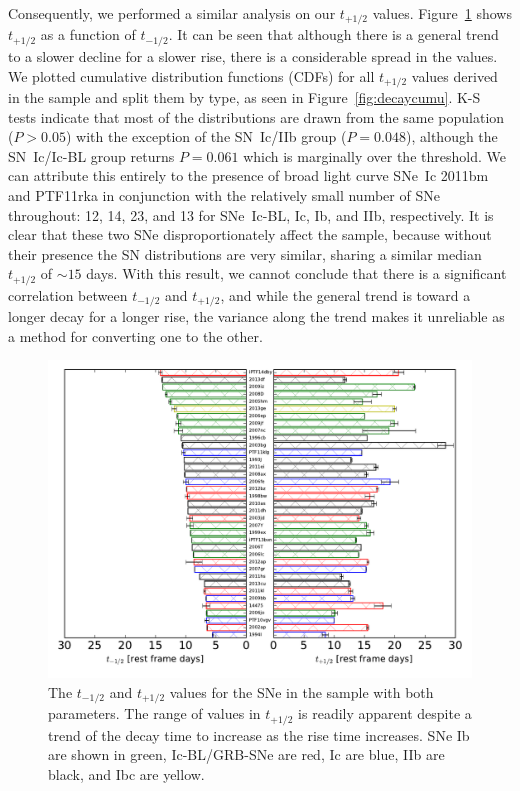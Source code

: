 \documentclass[a4paper,fleqn,usenatbib]{mnras}
\begin{document}
Consequently, we performed a similar analysis on our $t_{+1/2}$ values. Figure~\ref{fig:risedecay} shows $t_{+1/2}$ as a function of $t_{-1/2}$. It can be seen that although there is a general trend to a slower decline for a slower rise, there is a considerable spread in the values. We plotted cumulative distribution functions (CDFs) for all $t_{+1/2}$ values derived in the sample and split them by type, as seen in Figure~\ref{fig:decaycumu}. K-S tests indicate that most of the distributions are drawn from the same population ($P>0.05$) with the exception of the SN~Ic/IIb group ($P=0.048$), although the SN~Ic/Ic-BL group returns $P=0.061$ which is marginally over the threshold. We can attribute this entirely to the presence of broad light curve SNe~Ic 2011bm and PTF11rka in conjunction with the relatively small number of SNe throughout: 12, 14, 23, and 13 for SNe~Ic-BL, Ic, Ib, and IIb, respectively. It is clear that these two SNe disproportionately affect the sample, because without their presence the SN distributions are very similar, sharing a similar median $t_{+1/2}$ of $\sim 15$ days. With this result, we cannot conclude that there is a significant correlation between $t_{-1/2}$ and $t_{+1/2}$, and while the general trend is toward a longer decay for a longer rise, the variance along the trend makes it unreliable as a method for converting one to the other.

\begin{figure}
	\centering
	\includegraphics[scale=0.4]{rise-decay.pdf}
	\caption{The $t_{-1/2}$ and $t_{+1/2}$ values for the SNe in the sample with both parameters. The range of values in $t_{+1/2}$ is readily apparent despite a trend of the decay time to increase as the rise time increases. SNe Ib are shown in green, Ic-BL/GRB-SNe are red, Ic are blue, IIb are black, and Ibc are yellow. }
	\label{fig:risedecay}
\end{figure}
\end{document}
